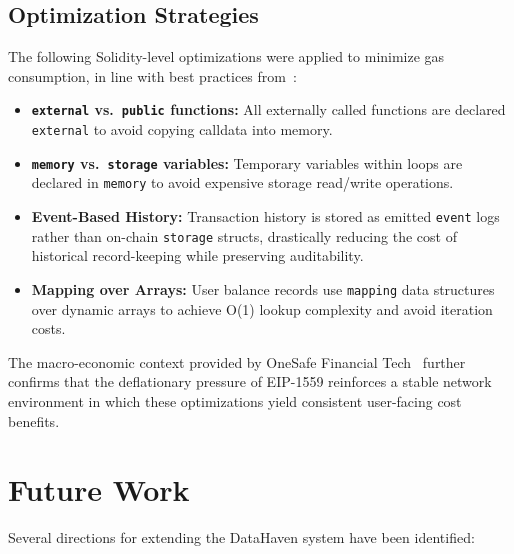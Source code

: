 \documentclass[conference]{IEEEtran}
\begin{document}
\subsection{Optimization Strategies}

The following Solidity-level optimizations were applied to minimize gas
consumption, in line with best practices from~\cite{ref13}:

\begin{itemize}
  \item \textbf{\texttt{external} vs.\ \texttt{public} functions:} All
    externally called functions are declared \texttt{external} to avoid copying
    calldata into memory.
  \item \textbf{\texttt{memory} vs.\ \texttt{storage} variables:} Temporary
    variables within loops are declared in \texttt{memory} to avoid expensive
    storage read/write operations.
  \item \textbf{Event-Based History:} Transaction history is stored as emitted
    \texttt{event} logs rather than on-chain \texttt{storage} structs,
    drastically reducing the cost of historical record-keeping while preserving
    auditability.
  \item \textbf{Mapping over Arrays:} User balance records use
    \texttt{mapping} data structures over dynamic arrays to achieve O(1) lookup
    complexity and avoid iteration costs.
\end{itemize}

The macro-economic context provided by OneSafe Financial Tech~\cite{ref10}
further confirms that the deflationary pressure of EIP-1559 reinforces a
stable network environment in which these optimizations yield consistent
user-facing cost benefits.

\section{Future Work}
\label{sec:future}

Several directions for extending the DataHaven system have been identified:
\end{document}
